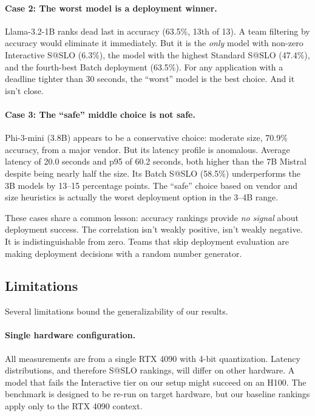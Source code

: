 \documentclass[11pt]{article}
\begin{document}
\paragraph{Case 2: The worst model is a deployment winner.}
Llama-3.2-1B ranks dead last in accuracy (63.5\%, 13th of 13).  A team filtering by accuracy would eliminate it immediately.  But it is the \emph{only} model with non-zero Interactive S@SLO (6.3\%), the model with the highest Standard S@SLO (47.4\%), and the fourth-best Batch deployment (63.5\%).  For any application with a deadline tighter than 30 seconds, the ``worst'' model is the best choice.  And it isn't close.

\paragraph{Case 3: The ``safe'' middle choice is not safe.}
Phi-3-mini (3.8B) appears to be a conservative choice: moderate size, 70.9\% accuracy, from a major vendor.  But its latency profile is anomalous.  Average latency of 20.0 seconds and p95 of 60.2 seconds, both higher than the 7B Mistral despite being nearly half the size.  Its Batch S@SLO (58.5\%) underperforms the 3B models by 13--15 percentage points.  The ``safe'' choice based on vendor and size heuristics is actually the worst deployment option in the 3--4B range.

These cases share a common lesson: accuracy rankings provide \emph{no signal} about deployment success.  The correlation isn't weakly positive, isn't weakly negative.  It is indistinguishable from zero.  Teams that skip deployment evaluation are making deployment decisions with a random number generator.

\subsection{Limitations}

Several limitations bound the generalizability of our results.

\paragraph{Single hardware configuration.}
All measurements are from a single RTX 4090 with 4-bit quantization.  Latency distributions, and therefore S@SLO rankings, will differ on other hardware.  A model that fails the Interactive tier on our setup might succeed on an H100.  The benchmark is designed to be re-run on target hardware, but our baseline rankings apply only to the RTX 4090 context.
\end{document}
